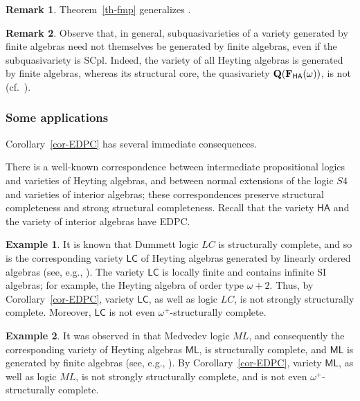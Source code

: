 \documentclass[submission,copyright,creativecommons]{eptcs}
\theoremstyle{definition}
\newtheorem{example}{Example}
\newtheorem{remark}{Remark}
\newcommand{\alg}[1]{{{\textbf{\upshape #1}}}}
\newcommand{\QQ}{\mathbf{Q}}
\newcommand{\vv}[1]{\mathsf {#1}}
\newcommand{\HA}{\mathsf{HA}}
\begin{document}
\begin{remark}
	Theorem~\ref{th-fmp} generalizes \cite[Corollary~1]{RautenbergNote1985}.
\end{remark}

\begin{remark}
	Observe that, in general, subquasivarieties of a variety generated by finite algebras need not themselves be generated by finite algebras, even if the subquasivariety is SCpl. Indeed, the variety of all Heyting algebras is generated by finite algebras, whereas its structural core, the quasivariety $\QQ(\alg{F}_{\HA}(\omega))$, is not (cf.\ \cite[Corollary~6.3.11]{RybakovBook}).
\end{remark}

\subsubsection*{Some applications} 

Corollary~\ref{cor-EDPC} has several immediate consequences.

There is a well-known correspondence between intermediate propositional logics and varieties of Heyting algebras, and between normal extensions of the logic $S4$ and varieties of interior algebras; these correspondences preserve structural completeness and strong structural completeness. Recall that the variety $\HA$ and the variety of interior algebras have EDPC.

\begin{example}
	It is known that Dummett logic $LC$ is structurally complete, and so is the corresponding variety $\vv{LC}$ of Heyting algebras generated by linearly ordered algebras (see, e.g., \cite{ChagrovZakh}). The variety $\vv{LC}$ is locally finite and contains infinite SI algebras; for example, the Heyting algebra of order type $\omega+2$. Thus, by Corollary~\ref{cor-EDPC}, variety $\vv{LC}$, as well as logic $LC$, is not strongly structurally complete. Moreover, $\vv{LC}$ is not even $\omega^+$-structurally complete.
\end{example}

\begin{example}
	It was observed in \cite{PrucnalStructural1976} that Medvedev logic $ML$, and consequently the corresponding variety of Heyting algebras $\vv{ML}$, is structurally complete, and $\vv{ML}$ is generated by finite algebras (see, e.g., \cite{ChagrovZakh}). By Corollary~\ref{cor-EDPC}, variety $\vv{ML}$, as well as logic $ML$, is not strongly structurally complete, and is not even $\omega^+$-structurally complete.
\end{example}
\end{document}
